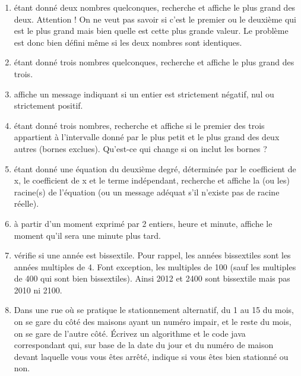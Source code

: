 \documentclass[11pt,a4paper]{article}
\begin{document}
					\begin{enumerate}
				
			\item \'etant donn\'e deux nombres quelconques, recherche et affiche le plus
              grand des deux. Attention ! On ne veut pas savoir si c'est le premier ou le deuxi\`eme qui est
              le plus grand mais bien quelle est cette plus grande valeur. Le probl\`eme est donc bien d\'efini
              m\^eme si les deux nombres sont identiques.
            
			\item \'etant donn\'e trois nombres quelconques, recherche et affiche le plus grand des trois.
			\item affiche un message indiquant si un entier est strictement n\'egatif, nul ou strictement positif.
			\item \'etant donn\'e trois nombres, recherche et affiche si le premier des 
            trois appartient \`a l'intervalle donn\'e par le plus petit et le plus grand des deux autres (bornes exclues). 
            Qu'est-ce qui change si on inclut les bornes ?
			\item \'etant donn\'e une \'equation du deuxi\`eme degr\'e, d\'etermin\'ee par le coefficient de x\texttwosuperior  , le coefficient de x et le terme ind\'ependant, 
            recherche et affiche la (ou les) racine(s) de l'\'equation (ou un message ad\'equat s'il n'existe pas de racine r\'eelle).
			\item \`a partir d'un moment exprim\'e par 2 entiers, heure et minute, affiche le moment qu'il sera une minute plus tard.
			\item v\'erifie si une ann\'ee est bissextile. Pour rappel, les ann\'ees bissextiles sont les ann\'ees multiples de 4.
             Font exception, les multiples de 100 (sauf les multiples de 400 qui sont bien bissextiles). Ainsi 2012 et 2400 sont bissextile mais pas 2010 ni 2100.
			\item Dans une rue o\`u se pratique le stationnement alternatif, du 1 au 15 du mois, on se gare du c\^ot\'e des maisons ayant un num\'ero impair, 
            et le reste du mois, on se gare de l'autre c\^ot\'e.
            \'Ecrivez un algorithme et le code java correspondant qui, sur base de la date du jour et du num\'ero de maison devant laquelle
            vous vous \^etes arr\^et\'e, indique si vous \^etes bien stationn\'e ou non.
					\end{enumerate}
				
            \par
        
				
\end{document}
